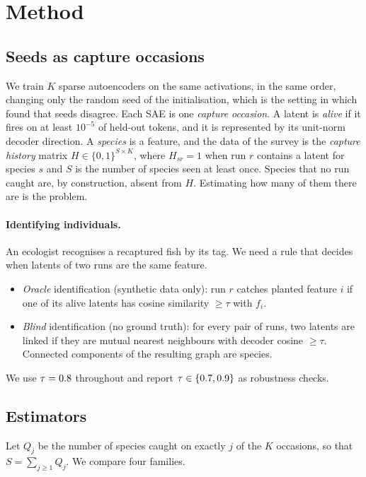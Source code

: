\section{Method}
\label{sec:method}

\subsection{Seeds as capture occasions}
We train $K$ sparse autoencoders on the same activations, in the same order, changing only the random seed of the initialisation, which is the setting in which \citet{paulo2025sparse} found that seeds disagree. Each SAE is one \emph{capture occasion}. A latent is \emph{alive} if it fires on at least $10^{-5}$ of held-out tokens, and it is represented by its unit-norm decoder direction. A \emph{species} is a feature, and the data of the survey is the \emph{capture history} matrix $H\in\{0,1\}^{S\times K}$, where $H_{sr}=1$ when run $r$ contains a latent for species $s$ and $S$ is the number of species seen at least once. Species that no run caught are, by construction, absent from $H$. Estimating how many of them there are is the problem.

\paragraph{Identifying individuals.} An ecologist recognises a recaptured fish by its tag. We need a rule that decides when latents of two runs are the same feature.
\begin{itemize}\setlength\itemsep{0pt}
\item \emph{Oracle} identification (synthetic data only): run $r$ catches planted feature $i$ if one of its alive latents has cosine similarity $\ge\tau$ with $f_i$.
\item \emph{Blind} identification (no ground truth): for every pair of runs, two latents are linked if they are mutual nearest neighbours with decoder cosine $\ge\tau$. Connected components of the resulting graph are species.
\end{itemize}
We use $\tau=0.8$ throughout and report $\tau\in\{0.7,0.9\}$ as robustness checks.

\subsection{Estimators}
Let $Q_j$ be the number of species caught on exactly $j$ of the $K$ occasions, so that $S=\sum_{j\ge1}Q_j$. We compare four families.

